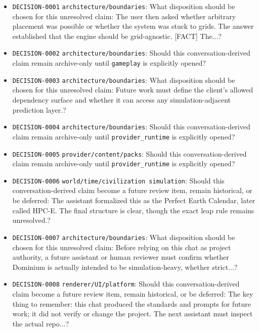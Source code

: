 \documentclass[9pt,a4paper,openany]{book}
\begin{document}
\begin{itemize}
\item \texttt{DECISION-\allowbreak{}0001} \texttt{architecture/\allowbreak{}boundaries}: What disposition should be chosen for this unresolved claim: The user then asked whether arbitrary placement was possible or whether the system was stuck to grids.\allowbreak{} The answer established that the engine should be grid-\allowbreak{}agnostic.\allowbreak{} [FACT] The.\allowbreak{}.\allowbreak{}.\allowbreak{}?
\item \texttt{DECISION-\allowbreak{}0002} \texttt{architecture/\allowbreak{}boundaries}: Should this conversation-\allowbreak{}derived claim remain archive-\allowbreak{}only until \texttt{gameplay} is explicitly opened?
\item \texttt{DECISION-\allowbreak{}0003} \texttt{architecture/\allowbreak{}boundaries}: What disposition should be chosen for this unresolved claim: Future work must define the client's allowed dependency surface and whether it can access any simulation-\allowbreak{}adjacent prediction layer.\allowbreak{}?
\item \texttt{DECISION-\allowbreak{}0004} \texttt{architecture/\allowbreak{}boundaries}: Should this conversation-\allowbreak{}derived claim remain archive-\allowbreak{}only until \texttt{provider\_\allowbreak{}runtime} is explicitly opened?
\item \texttt{DECISION-\allowbreak{}0005} \texttt{provider/\allowbreak{}content/\allowbreak{}packs}: Should this conversation-\allowbreak{}derived claim remain archive-\allowbreak{}only until \texttt{provider\_\allowbreak{}runtime} is explicitly opened?
\item \texttt{DECISION-\allowbreak{}0006} \texttt{world/\allowbreak{}time/\allowbreak{}civilization simulation}: Should this conversation-\allowbreak{}derived claim become a future review item, remain historical, or be deferred: The assistant formalized this as the Perfect Earth Calendar, later called HPC-\allowbreak{}E.\allowbreak{} The final structure is clear, though the exact leap rule remains unresolved.\allowbreak{}?
\item \texttt{DECISION-\allowbreak{}0007} \texttt{architecture/\allowbreak{}boundaries}: What disposition should be chosen for this unresolved claim: Before relying on this chat as project authority, a future assistant or human reviewer must confirm whether Dominium is actually intended to be simulation-\allowbreak{}heavy, whether strict.\allowbreak{}.\allowbreak{}.\allowbreak{}?
\item \texttt{DECISION-\allowbreak{}0008} \texttt{renderer/\allowbreak{}UI/\allowbreak{}platform}: Should this conversation-\allowbreak{}derived claim become a future review item, remain historical, or be deferred: The key thing to remember: this chat produced the standards and prompts for future work; it did not verify or change the project.\allowbreak{} The next assistant must inspect the actual repo.\allowbreak{}.\allowbreak{}.\allowbreak{}?

\end{itemize}
\end{document}
